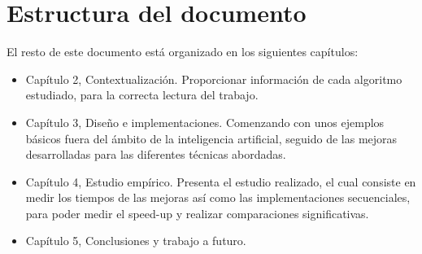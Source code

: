 	\newpage  %
	\section{Estructura del documento}
		El resto de este documento está organizado en los siguientes capítulos:
		
		
		\begin{itemize}
			\item Capítulo 2, Contextualización. Proporcionar información de cada algoritmo estudiado, para la correcta lectura del trabajo.
			
			\item Capítulo 3, Diseño e implementaciones. Comenzando con unos ejemplos básicos fuera del ámbito de la inteligencia artificial, seguido de las mejoras desarrolladas para las diferentes técnicas abordadas.
			
			\item Capítulo 4, Estudio empírico. Presenta el estudio realizado, el cual consiste en medir los tiempos de las mejoras así como las implementaciones secuenciales, para poder medir el speed-up y realizar comparaciones significativas.
			
			\item Capítulo 5, Conclusiones y trabajo a futuro.
		\end{itemize}
		
	
		
		
		
		
		
		
		
		
		
	